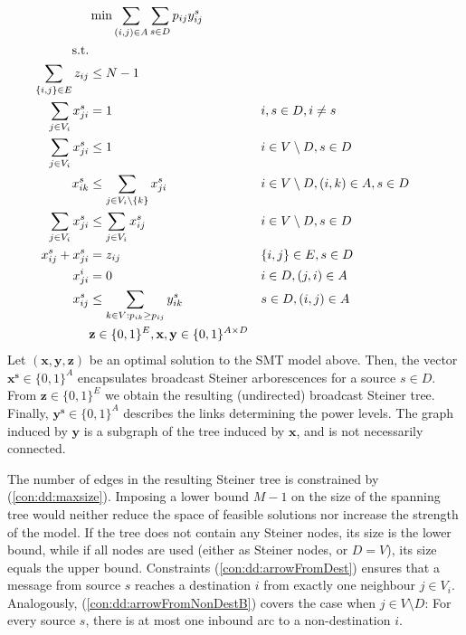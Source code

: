 \begin{subequations}
\begin{flalign}
\label{objective:dd} &\makebox[0pt][l]{$\displaystyle{}\min \sum\limits_{(i,j) \in A} \sum\limits_{s \in D} p_{ij} y^s_{ij} $}  & &&\\ \notag  
\text{s.t.}&  &  &                 && \\	\
\label{con:dd:maxsize}\sum\limits_{\{i,j\}\in E}z_{ij} & \leq  N-1 &  && \\
\label{con:dd:arrowFromDest} \sum\limits_{j\in V_i}x^s_{ji} & = 1 && i,s\in D,i\neq s && \\ 
\label{con:dd:arrowFromNonDestB} \sum\limits_{j\in V_{i}}x^s_{ji} & \leq 1 && i\in V \setminus D, s\in D   &&\\	
\label{con:dd:arrowFromNonDestA} x^s_{ik}  & \leq \sum\limits_{j\in V_{i}\setminus \{k\}}x^s_{ji} && i\in V \setminus D,(i,k)\in A, s\in D   &&\\	
\label{con:dd:extraCon} \sum\limits_{j\in V_{i}}x^s_{ji} & \leq \sum\limits_{j\in V_{i}}x^s_{ij} &&  	i\in V\setminus D, s\in D  &&\\	
\label{con:dd:oneDir} x^s_{ij} + x^s_{ji} & = z_{ij} && \{i,j\}\in E, s\in D &&\\
\label{con:dd:startInSource}  x^i_{ji}    & = 0   &&  i\in D, (j,i)\in A &&\\		 
\label{con:dd:yvar} x^s_{ij} & \leq \sum\limits_{k\in V:p_{ik}\geq p_{ij}}y^s_{ik} && s\in D, (i,j)\in A &&\\  
& \label{con:dd:vardim}	\mathbf{z} \in \{0,1\}^{E}, \mathbf{x},\mathbf{y}\in \{0,1\}^{A\times D} &&	
\end{flalign}~
\end{subequations}   
Let $(\mathbf{x},\mathbf{y}, \mathbf{z})$ be an optimal solution to the SMT model above. Then, the vector $\mathbf{x^s}\in \{0,1\}^{A}$ encapsulates broadcast Steiner arborescences for a source $s\in D$. From $\mathbf{z}\in \{0,1\}^E$ we obtain the resulting (undirected) broadcast Steiner tree. Finally, $\mathbf{y^s}\in \{0,1\}^{A}$ describes the links determining the power levels. The graph induced by $\mathbf{y}$ is  a subgraph of the tree induced by $\mathbf{x}$, and is not necessarily connected.

The number of edges in the resulting Steiner tree is constrained by (\ref{con:dd:maxsize}). Imposing a lower bound $M-1$ on the size of the spanning tree would neither reduce the space of feasible solutions nor increase the strength of the model. If the tree does not contain any Steiner nodes, its size is the lower bound, while if all nodes are used (either as Steiner nodes, or $D = V$), its size equals the upper bound. Constraints (\ref{con:dd:arrowFromDest}) ensures that a message from source $s$ reaches a destination $i$ from exactly one neighbour $j\in V_i$. Analogously, (\ref{con:dd:arrowFromNonDestB}) covers the case when $j \in V\setminus D$: For every source $s$, there is at most one inbound arc to a non-destination $i$. 

